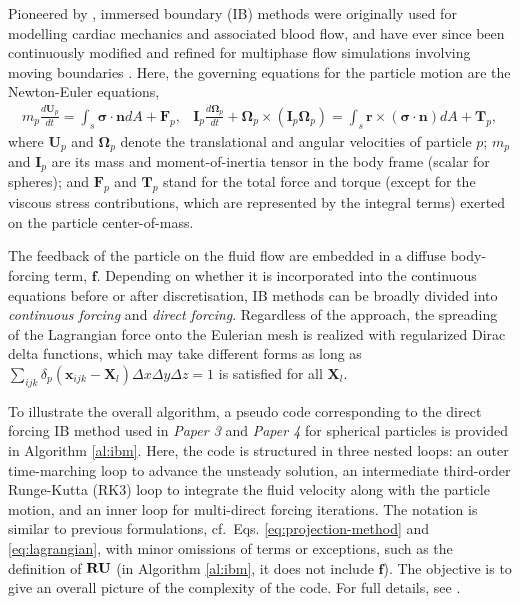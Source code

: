 Pioneered by \cite{Peskin}, immersed boundary (IB) methods were originally used for modelling cardiac mechanics and associated blood flow, and have ever since been continuously modified and refined for multiphase flow simulations involving moving boundaries \citep{fadlun_verzicco_orlandi_mohd-yusof_2000a, Uhlmann, mittal_iaccarino_2005a, pinelli_naqavi_piomelli_favier_2010a, Wim-Paul_JCP_2012, favier_revell_pinelli_2014a}.
Here, the governing equations for the particle motion are the Newton-Euler equations,
\begin{subequations} \label{eq:newton-euler}
  \begin{equation} 
    \begin{aligned} \label{eq:force-balance}
      m_p \frac{d{\bm U}_p}{dt} = \int_{s} \bm{\sigma \cdot n} dA + {\bm F}_p, 
    \end{aligned}
  \end{equation}
  \begin{equation} 
    \begin{aligned}
      {\bm I}_p \frac{d{\bm \Omega}_p}{dt} + {\bm \Omega}_p\times({\bm I}_p{\bm \Omega}_p) =
      \int_{s} \bm{r} \times (\bm{\sigma \cdot n}) dA + {\bm T}_p,
    \end{aligned}
  \end{equation}
\end{subequations}
where ${\bm U}_p$ and ${\bm \Omega}_p$ denote the translational and angular velocities of particle $p$;
$m_p$ and ${\bm I}_p$ are its mass and moment-of-inertia tensor in the body frame (scalar for spheres); and 
${\bm F}_p$ and ${\bm T}_p$ stand for the total force and torque (except for the viscous stress contributions, which are represented by the integral terms) exerted on the particle center-of-mass.

The feedback of the particle on the fluid flow are embedded in a diffuse body-forcing term, $\bm f$.
Depending on whether it is incorporated into the continuous equations before or after discretisation, IB methods can be broadly divided into \emph{continuous forcing} and \emph{direct forcing}.
Regardless of the approach, the spreading of the Lagrangian force onto the Eulerian mesh is realized with regularized Dirac delta functions, which may take different forms as long as $\sum_{ijk} \delta_p( \bm{x}_{ijk}-\bm{X}_{l}) \Delta x \Delta y \Delta z=1$ is satisfied for all $\bm{X}_{l}$.

To illustrate the overall algorithm, a pseudo code corresponding to the direct forcing IB method used in \emph{Paper 3} and \emph{Paper 4} for spherical particles is provided in Algorithm \ref{al:ibm}.
Here, the code is structured in three nested loops:
an outer time-marching loop to advance the unsteady solution,
an intermediate third-order Runge-Kutta (RK3) loop to integrate the fluid velocity along with the particle motion,
and an inner loop for multi-direct forcing iterations.
The notation is similar to previous formulations, cf.\ Eqs. \eqref{eq:projection-method} and \eqref{eq:lagrangian}, with minor omissions of terms or exceptions, such as the definition of ${\bf RU}$ (in Algorithm \ref{al:ibm}, it does not include $\bm f$).
The objective is to give an overall picture of the complexity of the code. For full details, see \cite{ Wim-Paul_JCP_2012}.


